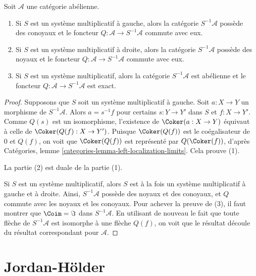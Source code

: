 \begin{lemma}
\label{lemma-localization-abelian}
Soit $\mathcal{A}$ une catégorie abélienne.
\begin{enumerate}
\item Si $S$ est un système multiplicatif à gauche, alors
la catégorie $S^{-1}\mathcal{A}$ possède des conoyaux et le foncteur
$Q : \mathcal{A} \to S^{-1}\mathcal{A}$ commute avec eux.
\item Si $S$ est un système multiplicatif à droite, alors
la catégorie $S^{-1}\mathcal{A}$ possède des noyaux et le foncteur
$Q : \mathcal{A} \to S^{-1}\mathcal{A}$ commute avec eux.
\item Si $S$ est un système multiplicatif, alors la catégorie
$S^{-1}\mathcal{A}$ est abélienne et le foncteur
$Q : \mathcal{A} \to S^{-1}\mathcal{A}$ est exact.
\end{enumerate}
\end{lemma}

\begin{proof}
Supposons que $S$ soit un système multiplicatif à gauche. Soit $a : X \to Y$ un morphisme
de $S^{-1}\mathcal{A}$. Alors $a = s^{-1}f$ pour certains $s : Y \to Y'$
dans $S$ et $f : X \to Y'$. Comme $Q(s)$ est un isomorphisme, l'existence
de $\Coker(a : X \to Y)$ équivaut à celle
de $\Coker(Q(f) : X \to Y')$. Puisque $\Coker(Q(f))$ est le
coégalisateur de $0$ et $Q(f)$, on voit que $\Coker(Q(f))$ est
représenté par $Q(\Coker(f))$, d'après
Catégories, lemme \ref{categories-lemma-left-localization-limits}.
Cela prouve (1).

\medskip\noindent
La partie (2) est duale de la partie (1).

\medskip\noindent
Si $S$ est un système multiplicatif, alors $S$ est à la fois un système multiplicatif
à gauche et à droite. Ainsi, $S^{-1}\mathcal{A}$ possède des
noyaux et des conoyaux, et $Q$ commute avec les noyaux et les conoyaux.
Pour achever la preuve de (3), il faut montrer que $\Coim = \Im$ dans
$S^{-1}\mathcal{A}$. En utilisant de nouveau le fait que toute flèche de $S^{-1}\mathcal{A}$
est isomorphe à une flèche $Q(f)$, on voit que le résultat découle
du résultat correspondant pour $\mathcal{A}$.
\end{proof}




\section{Jordan-H\"older}
\label{section-jordan-holder}

